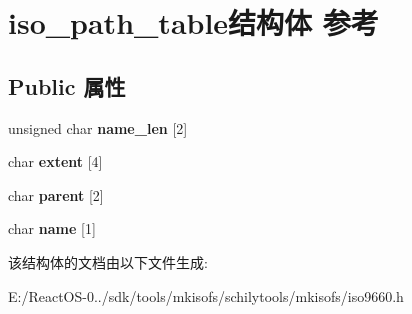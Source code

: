 \hypertarget{structiso__path__table}{}\section{iso\+\_\+path\+\_\+table结构体 参考}
\label{structiso__path__table}
\subsection*{Public 属性}
\begin{DoxyCompactItemize}
\item 
\mbox{\label{structiso__path__table_a2202ae81cdb6e4dfeec62ee2d79566a0}} 
unsigned char {\bfseries name\+\_\+len} \mbox{[}2\mbox{]}
\item 
\mbox{\label{structiso__path__table_a360f12d4b3cfcdc188316a8adf18ab40}} 
char {\bfseries extent} \mbox{[}4\mbox{]}
\item 
\mbox{\label{structiso__path__table_af4d7a1d380c22955f2a6a0f2ac0d7c2c}} 
char {\bfseries parent} \mbox{[}2\mbox{]}
\item 
\mbox{\label{structiso__path__table_a0a0a6e2f8bc0b1384574c63dc6cb6533}} 
char {\bfseries name} \mbox{[}1\mbox{]}
\end{DoxyCompactItemize}


该结构体的文档由以下文件生成\+:\begin{DoxyCompactItemize}
\item 
E\+:/\+React\+O\+S-\/0../sdk/tools/mkisofs/schilytools/mkisofs/iso9660.\+h\end{DoxyCompactItemize}
